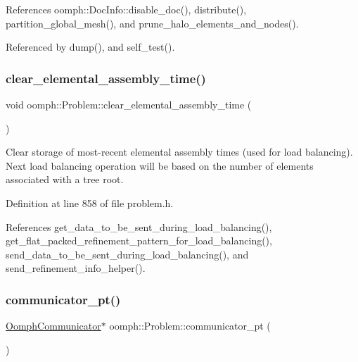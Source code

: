 References oomph\+::\+Doc\+Info\+::disable\+\_\+doc(), distribute(), partition\+\_\+global\+\_\+mesh(), and prune\+\_\+halo\+\_\+elements\+\_\+and\+\_\+nodes().



Referenced by dump(), and self\+\_\+test().

\mbox{\label{classoomph_1_1Problem_a07bad546a91f9d13936be6dc0590fcd0}} 
\subsubsection{\texorpdfstring{clear\+\_\+elemental\+\_\+assembly\+\_\+time()}{clear\_elemental\_assembly\_time()}}
{\footnotesize\ttfamily void oomph\+::\+Problem\+::clear\+\_\+elemental\+\_\+assembly\+\_\+time (\begin{DoxyParamCaption}{ }\end{DoxyParamCaption})\hspace{0.3cm}{\ttfamily [inline]}}



Clear storage of most-\/recent elemental assembly times (used for load balancing). Next load balancing operation will be based on the number of elements associated with a tree root. 



Definition at line 858 of file problem.\+h.



References get\+\_\+data\+\_\+to\+\_\+be\+\_\+sent\+\_\+during\+\_\+load\+\_\+balancing(), get\+\_\+flat\+\_\+packed\+\_\+refinement\+\_\+pattern\+\_\+for\+\_\+load\+\_\+balancing(), send\+\_\+data\+\_\+to\+\_\+be\+\_\+sent\+\_\+during\+\_\+load\+\_\+balancing(), and send\+\_\+refinement\+\_\+info\+\_\+helper().

\mbox{\label{classoomph_1_1Problem_a600bb1740edd0aa07c6d001033bf676a}} 
\subsubsection{\texorpdfstring{communicator\+\_\+pt()}{communicator\_pt()}\hspace{0.1cm}{\footnotesize\ttfamily [1/2]}}
{\footnotesize\ttfamily \hyperlink{classoomph_1_1OomphCommunicator}{Oomph\+Communicator}$\ast$ oomph\+::\+Problem\+::communicator\+\_\+pt (\begin{DoxyParamCaption}{ }\end{DoxyParamCaption})\hspace{0.3cm}{\ttfamily [inline]}}



